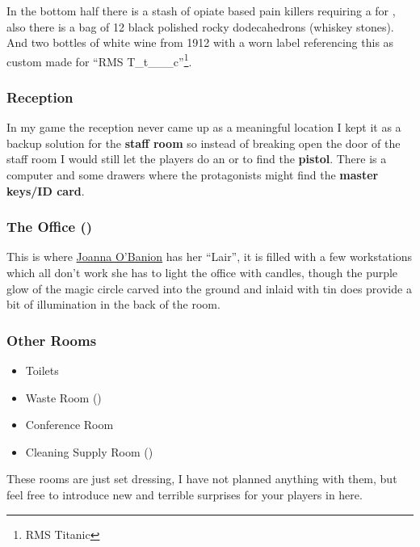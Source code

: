 \documentclass[bg-full]{resources/stylesheets/kult}
\begin{document}
In the bottom half there is a stash of opiate based pain killers requiring a  for , also
there is a bag of 12 black polished rocky dodecahedrons (whiskey stones).  And two bottles of white wine from 1912 with a worn label
referencing this as custom made for “RMS T\_t\_\_\_c”\footnote{RMS Titanic}.

\subsubsection{Reception}%
\label{ssub:reception}

In my game the reception never came up as a meaningful location I kept it as a backup solution for the \textbf{staff room} so
instead of breaking open the door of the staff room I would still let the players do an 
or  to find the \textbf{pistol}.  There is a computer and some drawers where the protagonists might
find the \textbf{master keys/ID card}.

\subsubsection{The Office (\faLock)}%
\label{ssub:the_office}

This is where \hyperref[ssub:joanna_o_banion]{Joanna O'Banion} has her “Lair”, it is filled with a few workstations which all
don't work she has to light the office with candles, though the purple glow of the magic circle carved into the ground and
inlaid with tin does provide a bit of illumination in the back of the room.


\subsubsection{Other Rooms}%
\label{ssub:other_rooms}

\begin{itemize}[noitemsep]
  \item Toilets
  \item Waste Room (\faLock)
  \item Conference Room
  \item Cleaning Supply Room (\faLock)
\end{itemize}

These rooms are just set dressing, I have not planned anything with them, but feel free to introduce new and terrible surprises
for your players in here.
\end{document}
